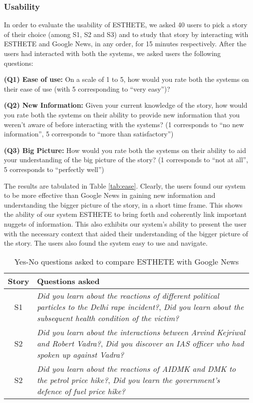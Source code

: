 \normalsize
\subsubsection*{Usability}
In order to evaluate the usability of ESTHETE, we asked 40 users to pick a story of their choice (among S1, S2 and S3) and to study that story by interacting with ESTHETE and Google News, in any order, for 15 minutes respectively. After the users had interacted with both the systems, we asked users the following questions:

\squishlist
	\item {\bf (Q1) Ease of use:} On a scale of 1 to 5, how would you rate both the systems on their ease of use (with 5 corresponding to ``very easy'')?
	\item {\bf (Q2) New Information:} Given your current knowledge of the story, how would you rate both the systems on their ability to provide new information that you weren't aware of before interacting with the systems? (1 corresponds to ``no new information'', 5 corresponds to ``more than satisfactory'')
	\item {\bf (Q3) Big Picture:} How would you rate both the systems on their ability to aid your understanding of the big picture of the story? (1 corresponds to ``not at all'', 5 corresponds to ``perfectly well'')
\squishend

The results are tabulated in Table \ref{tab:ease}.
Clearly, the users found our system to be more effective than Google News in gaining new information and understanding the bigger picture of the story, in a short time frame. This shows the ability of our system ESTHETE to bring forth and coherently link important nuggets of information. This also exhibits our system's ability to present the user with the necessary context that aided their understanding of the bigger picture of the story. The users also found the system easy to use and navigate.


\begin{table}
\small
\begin{tabular}{|c|p{7cm}|}
\hline
{\bf Story} & {\bf Questions asked}\\
\hline
S1 & {\em Did you learn about the reactions of different political particles to the Delhi rape incident?}, {\em Did you learn about the subsequent health condition of the victim?}\\
\hline
S2 & {\em Did you learn about the interactions between Arvind Kejriwal and Robert Vadra?}, {\em Did you discover an IAS officer who had spoken up against Vadra?}\\
\hline
S2 & {\em Did you learn about the reactions of AIDMK and DMK to the petrol price hike?}, {\em Did you learn the government's defence of fuel price hike?}\\
\hline
\end{tabular}
\caption{Yes-No questions asked to compare ESTHETE with Google News}
\label{tab:domain-yes-no-questions}
\end{table}
